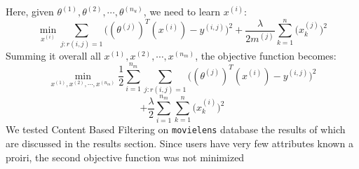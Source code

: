 \documentclass[twocolumn]{article}
\begin{document}
Here, given $\theta^{(1)},\theta^{(2)},\cdots,\theta^{(n_u)}$, we need to learn $x^{(i)}$:
$$\min_{x^{(i)}} \displaystyle\sum\limits_{j:r(i,j)=1} \Big((\theta^{(j)})^T(x^{(i)})-y^{(i,j)}\Big)^2 + \frac{\lambda}{2m^{(j)}}\displaystyle\sum\limits_{k=1}^{n} \Big(x_k^{(j)}\Big)^2$$
Summing it overall all $x^{(1)},x^{(2)},\cdots,x^{(n_m)}$, the objective function becomes:
$$\min_{x^{(1)},x^{(2)},\cdots,x^{(n_m)}} \frac{1}{2}\displaystyle\sum\limits_{i=1}^{n_m} \displaystyle\sum\limits_{j:r(i,j)=1} \Big((\theta^{(j)})^T(x^{(i)})-y^{(i,j)}\Big)^2$$ $$+ \frac{\lambda}{2}\displaystyle\sum\limits_{i=1}^{n_m} \displaystyle\sum\limits_{k=1}^{n} \Big(x_k^{(i)}\Big)^2$$
We tested Content Based Filtering on \texttt{movielens} database the results of which are discussed in the results section. Since users have very few attributes known a proiri, the second objective function was not minimized
\end{document}
